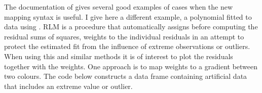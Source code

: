 \documentclass[krantz2]{krantz}\usepackage{knitr}
\begin{document}
%
%
The documentation of  gives several good examples of cases when the new mapping syntax is useful. I give here a different example, a polynomial fitted to data using . RLM is a procedure that automatically assigns before computing the residual sums of squares, weights to the individual residuals in an attempt to protect the estimated fit from the influence of extreme observations or outliers. When using this and similar methods it is of interest to plot the residuals together with the weights. One approach is to map weights to a gradient between two colours. The code below constructs a data frame containing artificial data that includes an extreme value or outlier.

\begin{knitrout}\footnotesize
{}\color{fgcolor}\begin{kframe}
\begin{alltt}
\hlstd{(}\hlstd{)}
 \hlkwb{<-} \hlopt{:}
 \hlkwb{<-}  \hlopt{+} \hlopt{^} \hlopt{+} \hlopt{^}\hlstd{)} \hlopt{+} \hlstd{(}  \hlstd{=} \hlstd{,}  \hlstd{=} \hlopt{^}\hlstd{)} \hlopt{/} \hlstd{)}
 \hlkwb{<-} 
 \hlkwb{<-} 
\hlstd{df2[}\hlstd{,} \hlstd{]} \hlkwb{<-}\hlstd{df1[}\hlstd{,} \hlstd{]} \hlopt{*} 
\end{alltt}
\end{kframe}
\end{knitrout}
\end{document}
